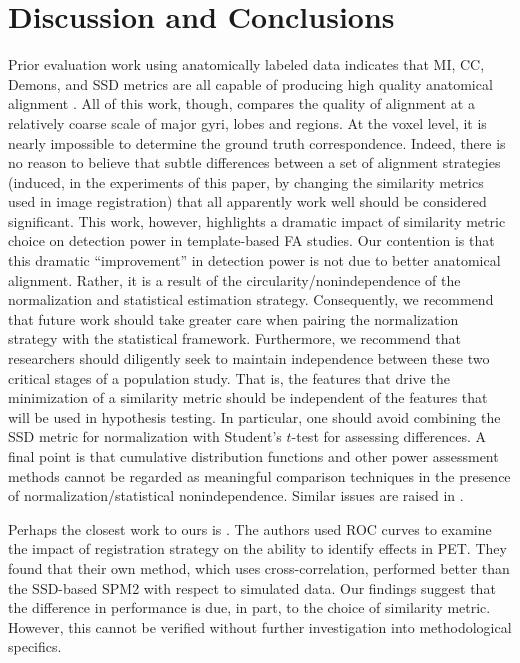 \documentclass[final,5p,times,twocolumn]{elsarticle}
\begin{document}
\section{Discussion and Conclusions} 
Prior evaluation work using anatomically labeled
data indicates that MI, CC, Demons, and
SSD metrics are all capable of producing high quality anatomical
alignment \citep[see][]{Klein2009}.  All of this work, though, compares
the quality of alignment at a relatively coarse scale of major gyri,
lobes and regions.  At the voxel level, it is nearly impossible to
determine the ground truth correspondence.  Indeed, there is no reason
to believe that subtle differences between a set of alignment
strategies (induced, in the experiments of this paper, by changing the
similarity metrics used in image registration) that all apparently
work well should be considered significant.  This work, however,
highlights a dramatic impact of similarity metric choice on detection
power in template-based FA studies.  Our contention is that this
dramatic ``improvement'' in detection power is not due to better
anatomical alignment.  Rather, it is a result of the
circularity/nonindependence of the normalization and statistical
estimation strategy.  Consequently, we recommend that future work
should take greater care when pairing the normalization strategy with
the statistical framework.  Furthermore, we recommend that researchers
should diligently seek to maintain independence between these two
critical stages of a population study.  That is, the features that
drive the minimization of a similarity metric should be independent of
the features that will be used in hypothesis testing.  In particular,
one should avoid combining the SSD metric for normalization with
Student's $t$-test for assessing {\color{red}{image-derived}} differences.  A final point is that
cumulative distribution functions and other power assessment methods
cannot be regarded as meaningful comparison techniques in the presence
of normalization/statistical nonindependence.  Similar issues are
raised in \cite{Kriegeskorte2010}.

Perhaps the closest work to ours is \cite{Wenzel2010}.  The authors
used ROC curves to examine the impact of registration strategy on the
ability to identify effects in PET.  They found that
their own method, which uses cross-correlation, performed
better than the SSD-based SPM2 with respect to simulated data.  Our
findings suggest that the difference in performance is due, in part,
to the choice of similarity metric.  However, this cannot be verified
without further investigation into methodological specifics. 
{}
\end{document}

